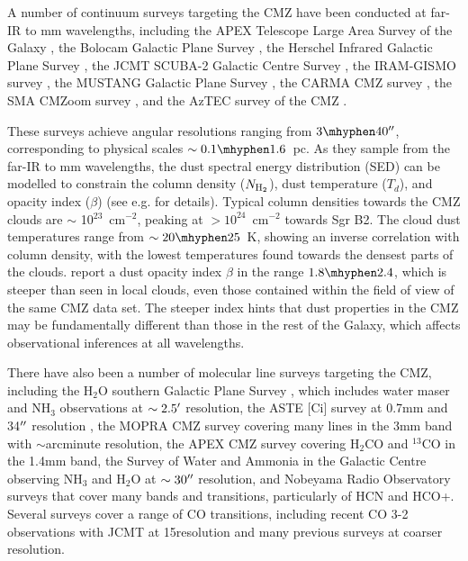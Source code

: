 A number of continuum surveys targeting the CMZ have been conducted at far-IR to mm wavelengths, including the APEX Telescope Large Area Survey of the Galaxy \citep[ATLASGAL,][]{Schuller2009}, the Bolocam Galactic Plane Survey \citep[BGPS,][]{Bally2010, Rosolowsky2010, Aguirre2011, Ginsburg2013}, the Herschel Infrared Galactic Plane Survey \citep[Hi-GAL,][]{Molinari2010, Molinari2011}, the JCMT SCUBA-2 Galactic Centre Survey \citep{Parsons2018}, the IRAM-GISMO survey \citep{Arendt2019,Staguhn2019}, the MUSTANG Galactic Plane Survey \citep{Ginsburg2020}, the CARMA CMZ survey \citep{Pound2018}, the SMA CMZoom survey \citep{Battersby2020}, and the AzTEC survey of the CMZ \citep{Tang2021a, Tang2021b}.

These surveys achieve angular resolutions ranging from $3\mhyphen40^{\prime\prime}$, corresponding to physical scales $\sim0.1\mhyphen1.6$~pc. As they sample from the far-IR to mm wavelengths, the dust spectral energy distribution (SED) can be modelled to constrain the column density ($N_{\rm H_{2}}$), dust temperature ($T_d$), and opacity index ($\beta$) (see e.g. \citealt{Battersby2011, Molinari2011,Marsh2016,Tang2021a, Tang2021b} for details).  Typical column densities towards the CMZ clouds are $\sim$ 10$^{23}$~cm$^{-2}$, peaking at $>10^{24}$~cm$^{-2}$ towards Sgr B2. The cloud dust temperatures range from $\sim20\mhyphen25$~K, showing an inverse correlation with column density, with the lowest temperatures found towards the densest parts of the clouds. \citet{Tang2021a} report a dust opacity index $\beta$ in the range $1.8\mhyphen2.4$, which is steeper than seen in local clouds, even those contained within the field of view of the same CMZ data set.  The steeper index hints that dust properties in the CMZ may be fundamentally different than those in the rest of the Galaxy, which affects observational inferences at all wavelengths.

There have also been a number of molecular line surveys targeting the CMZ, including the H$_{2}$O southern Galactic Plane Survey \citep[HOPS,][]{Walsh2008, Walsh2011, Purcell2012, Longmore2017, Akhter2021}, which includes water maser and NH$_3$ observations at $\sim2.5\mbox{$^\prime$}$ resolution, the ASTE [{C{\sc i}\xspace}] survey at 0.7mm and 34$\mbox{$^{\prime\prime}$}$ resolution \citep{Tanaka2011}, the MOPRA CMZ survey \citep{Jones2012, Jones2013} covering many lines in the 3mm band with $\sim$arcminute resolution, the APEX CMZ survey \citep{Ginsburg2016} covering H$_2$CO and $^{13}$CO in the 1.4mm band, the Survey of Water and Ammonia in the Galactic Centre \citep[SWAG,][]{Krieger2017} observing NH$_3$ and H$_2$O at $\sim30\mbox{$^{\prime\prime}$}$ resolution, and Nobeyama Radio Observatory surveys \citep{Tanaka2018,Tanaka2020} that cover many bands and transitions, particularly of HCN and HCO+.   Several surveys cover a range of CO transitions, including recent CO 3-2 observations with JCMT \citep{Parsons2018,Eden2020} at 15\arcsec resolution and many previous surveys at coarser resolution.

